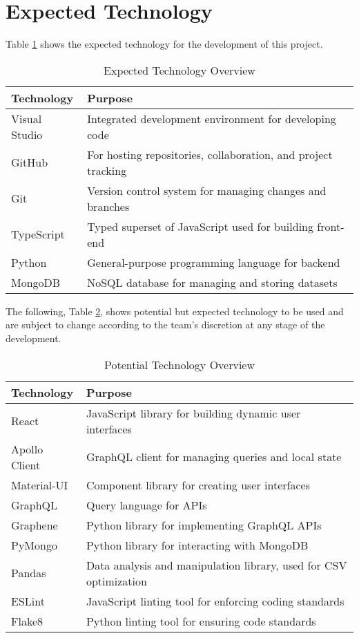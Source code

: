 \documentclass{article}
\begin{document}
\section{Expected Technology}
Table \ref{table:3} shows the expected technology for the development of this project.
\begin{table}[htbp]
    \centering
    \begin{tabularx}{\textwidth}{|l|>{\raggedright\arraybackslash}X|}  
    \hline
    \textbf{Technology} & \textbf{Purpose} \\
    \hline
    Visual Studio & Integrated development environment for developing code \\
    \hline
    GitHub & For hosting repositories, collaboration, and project tracking \\
    \hline
    Git & Version control system for managing changes and branches \\
    \hline
    TypeScript & Typed superset of JavaScript used for building front-end \\
    \hline
    Python & General-purpose programming language for backend \\
    \hline
    MongoDB & NoSQL database for managing and storing datasets \\
    \hline
    \end{tabularx}
    \caption{Expected Technology Overview}
    \label{table:3}
\end{table}

\noindent The following, Table \ref{table:4}, shows potential but expected technology to be used and are subject
to change according to the team’s discretion at any stage of the development.
\begin{table}[htbp]
    \centering
    \begin{tabularx}{\textwidth}{|l|>{\raggedright\arraybackslash}X|}  
    \hline
    \textbf{Technology} & \textbf{Purpose} \\
    \hline
    React & JavaScript library for building dynamic user interfaces \\
    \hline
    Apollo Client & GraphQL client for managing queries and local state \\
    \hline
    Material-UI & Component library for creating user interfaces \\
    \hline
    GraphQL & Query language for APIs \\
    \hline
    Graphene & Python library for implementing GraphQL APIs \\
    \hline
    PyMongo & Python library for interacting with MongoDB \\
    \hline
    Pandas & Data analysis and manipulation library, used for CSV optimization
    \\
    \hline
    ESLint & JavaScript linting tool for enforcing coding standards \\
    \hline
    Flake8 & Python linting tool for ensuring code standards \\
    \hline
    \end{tabularx}
    \caption{Potential Technology Overview}
    \label{table:4}
\end{table}
\end{document}
